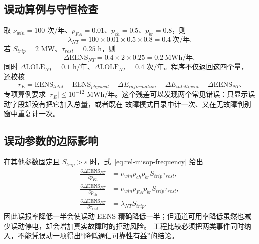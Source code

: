 \subsection{误动算例与守恒检查}
取 $\nu_{win}=100$ 次/年、$p_{FA}=0.01$、$p_{ch}=0.5$、$p_{br}=0.8$，则
\begin{equation}
 \lambda_{NT}=100\times0.01\times0.5\times0.8=0.4\ \text{次/年}.
\end{equation}
若 $S_{trip}=2$ MW、$\tau_{rest}=0.25$ h，则
\begin{equation}
 \Delta\mathrm{EENS}_{NT}=0.4\times2\times0.25=0.2\ \text{MWh/年},
\end{equation}
同时 $\Delta\mathrm{LOLE}_{NT}=0.1$ h/年、$\Delta\mathrm{LOLF}_{NT}=0.4$ 次/年。程序不仅返回这四个量，
还校核
\begin{equation}\label{eq:rel-eens-decomposition}
 r_E=\mathrm{EENS}_{total}-\mathrm{EENS}_{physical}
 -\Delta E_{information}-\Delta E_{intelligent}
 -\Delta\mathrm{EENS}_{NT}.
\end{equation}
专项算例要求 $|r_E|\le10^{-12}$ MWh/年。这个残差可以发现两个常见错误：只显示误动字段却没有把它加入总量，或者既在
故障模式目录中计一次、又在无故障判别窗中重复计一次。

\subsection{误动参数的边际影响}
在其他参数固定且 $S_{trip}>\varepsilon$ 时，式~\eqref{eq:rel-misop-frequency} 给出
\begin{align}
 \frac{\partial\Delta\mathrm{EENS}_{NT}}{\partial p_{FA}}
 &=\nu_{win}p_{ch}p_{br}S_{trip}\tau_{rest},\\
 \frac{\partial\Delta\mathrm{EENS}_{NT}}{\partial p_{ch}}
 &=\nu_{win}p_{FA}p_{br}S_{trip}\tau_{rest},\\
 \frac{\partial\Delta\mathrm{EENS}_{NT}}{\partial\tau_{rest}}
 &=\lambda_{NT}S_{trip}.
\end{align}
因此误报率降低一半会使误动 EENS 精确降低一半；但通道可用率降低虽然也减少误动停电，却会增加真实故障时的拒动风险。
工程比较必须把两类事件同时纳入，不能凭误动一项得出“降低通信可靠性有益”的结论。

